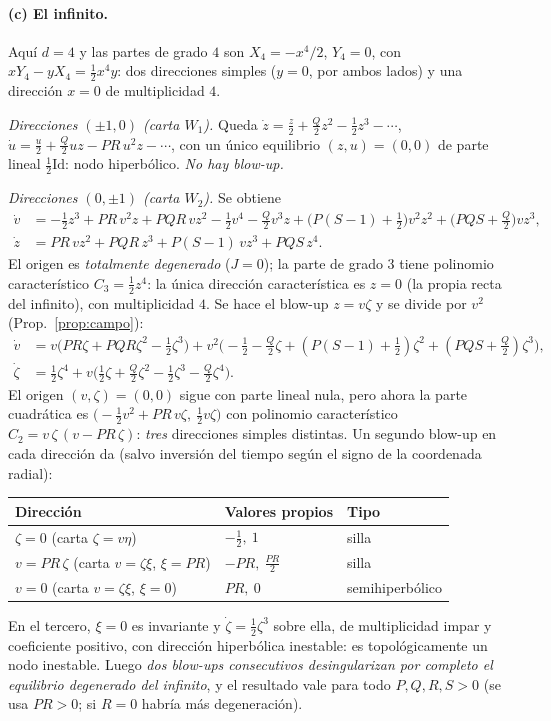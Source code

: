 \documentclass[11pt,a4paper]{article}
\theoremstyle{plain}
\theoremstyle{definition}
\theoremstyle{remark}
\begin{document}
\paragraph{(c) El infinito.} Aquí $d=4$ y las partes de grado $4$ son $X_4=-x^4/2$, $Y_4=0$, con $xY_4-yX_4=\tfrac12x^4y$: dos direcciones simples ($y=0$, por ambos lados) y una dirección $x=0$ de multiplicidad $4$.

\emph{Direcciones $(\pm1,0)$ (carta $W_1$).} Queda $\dot z=\tfrac z2+\tfrac Q2z^2-\tfrac12z^3-\cdots$, $\dot u=\tfrac u2+\tfrac Q2uz-PR\,u^2z-\cdots$, con un único equilibrio $(z,u)=(0,0)$ de parte lineal $\tfrac12\mathrm{Id}$: nodo hiperbólico. \emph{No hay blow-up.}

\emph{Direcciones $(0,\pm1)$ (carta $W_2$).} Se obtiene
\begin{align*}
\dot v&=-\tfrac12z^3+PR\,v^2z+PQR\,vz^2-\tfrac12v^4-\tfrac Q2v^3z+\big(P(S-1)+\tfrac12\big)v^2z^2+\big(PQS+\tfrac Q2\big)vz^3,\\
\dot z&=PR\,vz^2+PQR\,z^3+P(S-1)\,vz^3+PQS\,z^4 .
\end{align*}
El origen es \emph{totalmente degenerado} ($J=0$); la parte de grado $3$ tiene polinomio característico $C_3=\tfrac12z^4$: la única dirección característica es $z=0$ (la propia recta del infinito), con multiplicidad $4$. Se hace el blow-up $z=v\zeta$ y se divide por $v^2$ (Prop.~\ref{prop:campo}):
\begin{align*}
\dot v&=v\big(PR\zeta+PQR\zeta^2-\tfrac12\zeta^3\big)+v^2\big(-\tfrac12-\tfrac Q2\zeta+(P(S-1)+\tfrac12)\zeta^2+(PQS+\tfrac Q2)\zeta^3\big),\\
\dot\zeta&=\tfrac12\zeta^4+v\big(\tfrac12\zeta+\tfrac Q2\zeta^2-\tfrac12\zeta^3-\tfrac Q2\zeta^4\big).
\end{align*}
El origen $(v,\zeta)=(0,0)$ sigue con parte lineal nula, pero ahora la parte cuadrática es $\big(-\tfrac12v^2+PR\,v\zeta,\ \tfrac12v\zeta\big)$ con polinomio característico $C_2=v\,\zeta\,(v-PR\,\zeta)$: \emph{tres} direcciones simples distintas. Un segundo blow-up en cada dirección da (salvo inversión del tiempo según el signo de la coordenada radial):
\begin{center}
\begin{tabular}{@{}l l l@{}}
\toprule
Dirección & Valores propios & Tipo \\
\midrule
$\zeta=0$ (carta $\zeta=v\eta$) & $-\tfrac12,\ 1$ & silla \\
$v=PR\,\zeta$ (carta $v=\zeta\xi$, $\xi=PR$) & $-PR,\ \tfrac{PR}2$ & silla \\
$v=0$ (carta $v=\zeta\xi$, $\xi=0$) & $PR,\ 0$ & semihiperbólico \\
\bottomrule
\end{tabular}
\end{center}
En el tercero, $\xi=0$ es invariante y $\dot\zeta=\tfrac12\zeta^3$ sobre ella, de multiplicidad impar y coeficiente positivo, con dirección hiperbólica inestable: es topológicamente un nodo inestable. Luego \emph{dos blow-ups consecutivos desingularizan por completo el equilibrio degenerado del infinito}, y el resultado vale para todo $P,Q,R,S>0$ (se usa $PR>0$; si $R=0$ habría más degeneración).
\end{document}
